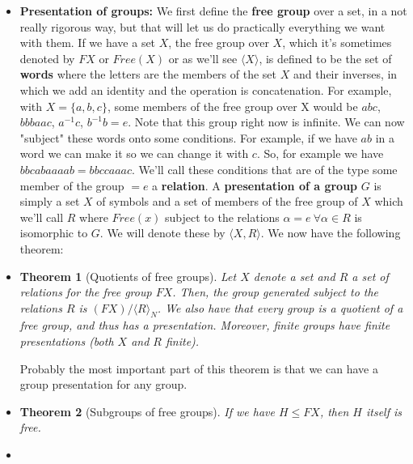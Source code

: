 \documentclass[a4paper]{article}
\newtheorem{theorem}{Theorem}[section]
\begin{document}
\begin{itemize}
\item
\textbf{Presentation of groups: } We first define the \textbf{free group} over a set, in a not really rigorous way, but that will let us do practically everything we want with them. If we have a set $X$, the free group over $X$, which it's sometimes denoted by $FX$ or $Free(X)$ or as we'll see $\langle X \rangle$, is defined to be the set of \textbf{words} where the letters are the members of the set $X$ and their inverses, in which we add an identity and the operation is concatenation. For example, with $X=\{ a,b,c \}$, some  members of the free group over X would be $abc$, $bbbaac$, $a^{-1}c$, $b^{-1}b = e$. Note that this group right now is infinite. We can now "subject" these words onto some conditions. For example, if we have $ab$ in a word we can make it so we can change it with $c$. So, for example we have $bbcabaaaab = bbccaaac$. We'll call these conditions that are of the type some member of the group $= e$ a \textbf{relation}. A \textbf{presentation of a group} $G$  is simply a set $X$ of symbols and a set of members of the free group of $X$ which we'll call $R$ where $Free(x)$ subject to the relations $\alpha = e\ \forall \alpha \in R$ is isomorphic to $G$. We will denote these by $\langle X,R \rangle$. We now have the following theorem:

\item
\begin{theorem}[Quotients of free groups]
Let $X$ denote a set and $R$ a set of relations for the free group $FX$. Then, the group generated subject to the relations $R$ is $(FX)/\langle R \rangle_{N}$. We also have that every group is a quotient of a free group, and thus has a presentation. Moreover, finite groups have finite presentations (both $X$ and $R$ finite).
\end{theorem}

Probably the most important part of this theorem is that we can have a group presentation for any group.

\item
\begin{theorem}[Subgroups of free groups]
If we have $H \leq FX$, then $H$ itself is free.
\end{theorem}

\item

\end{itemize}
\end{document}
